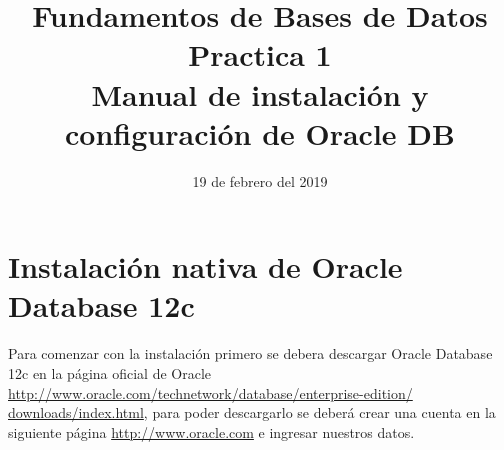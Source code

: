 \documentclass[10pt]{article}
\begin{document}
	\title{Fundamentos de Bases de Datos \\
		Practica 1 \\
		Manual de instalación y configuración de Oracle DB} 
	\author{}
	\date{19 de febrero del 2019}
	\maketitle




	\section{Instalación nativa de Oracle Database 12c}
	
	Para comenzar con la instalación primero se debera descargar Oracle Database 12c en la página oficial de Oracle  \url{http://www.oracle.com/technetwork/database/enterprise-edition/
		downloads/index.html}, para poder descargarlo se deberá crear una cuenta en la siguiente página \url{http://www.oracle.com} e ingresar nuestros datos.
\end{document}
